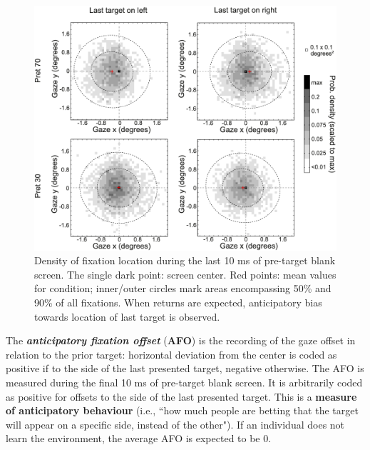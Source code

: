 \begin{figure}[!ht]
    \centering
    \captionsetup{width=.8\linewidth}
    \includegraphics[width=0.6\linewidth]{images/afo.png}
    \caption{Density of fixation location during the last 10 ms of pre-target blank screen. The single dark point: screen center. Red points: mean values for condition; inner/outer circles mark areas encompassing 50\% and 90\% of all fixations. When returns are expected, anticipatory bias towards location of last target is observed.}
    \label{fig:afo}
\end{figure}

The \textbf{\textit{anticipatory fixation offset}} (\textbf{AFO}) is the recording of the gaze offset in relation to the prior target: horizontal deviation from the center is coded as positive if to the side of the last presented target, negative otherwise. The AFO is measured during the final 10 ms of pre-target blank screen. It is arbitrarily coded as positive for offsets to the side of the last presented target. This is a \textbf{measure of anticipatory behaviour} (i.e., ``how much people are betting that the target will appear on a specific side, instead of the other"). If an individual does not learn the environment, the average AFO is expected to be 0.

